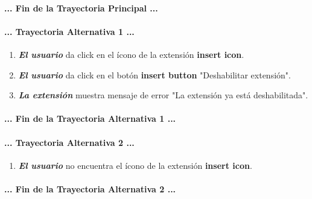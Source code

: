 \documentclass[12pt, a4paper, titlepage]{article}
\begin{document}
				\paragraph{... Fin de la Trayectoria Principal ...}
				
				\paragraph{... Trayectoria Alternativa 1 ...}
				\begin{enumerate}
					\item \textbf{\textit{El usuario}} da click en el ícono de la extensión \textbf{insert icon}.
					\item \textbf{\textit{El usuario}} da click en el botón \textbf{insert button} "Deshabilitar extensión".
					\item \textbf{\textit{La extensión}} muestra mensaje de error "La extensión ya está deshabilitada".
				\end{enumerate}
				\paragraph{... Fin de la Trayectoria Alternativa 1 ...}
				
				\paragraph{... Trayectoria Alternativa 2 ...}
				\begin{enumerate}
					\item \textbf{\textit{El usuario}} no encuentra el ícono de la extensión \textbf{insert icon}.
				\end{enumerate}
				\paragraph{... Fin de la Trayectoria Alternativa 2 ...}
				
				\newpage
				
\end{document}
